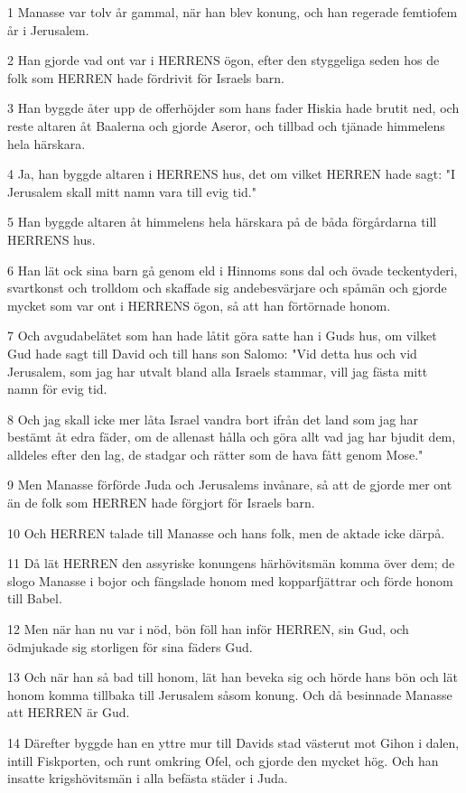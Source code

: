 \par 1 Manasse var tolv år gammal, när han blev konung, och han regerade femtiofem år i Jerusalem.
\par 2 Han gjorde vad ont var i HERRENS ögon, efter den styggeliga seden hos de folk som HERREN hade fördrivit för Israels barn.
\par 3 Han byggde åter upp de offerhöjder som hans fader Hiskia hade brutit ned, och reste altaren åt Baalerna och gjorde Aseror, och tillbad och tjänade himmelens hela härskara.
\par 4 Ja, han byggde altaren i HERRENS hus, det om vilket HERREN hade sagt: "I Jerusalem skall mitt namn vara till evig tid."
\par 5 Han byggde altaren åt himmelens hela härskara på de båda förgårdarna till HERRENS hus.
\par 6 Han lät ock sina barn gå genom eld i Hinnoms sons dal och övade teckentyderi, svartkonst och trolldom och skaffade sig andebesvärjare och spåmän och gjorde mycket som var ont i HERRENS ögon, så att han förtörnade honom.
\par 7 Och avgudabelätet som han hade låtit göra satte han i Guds hus, om vilket Gud hade sagt till David och till hans son Salomo: "Vid detta hus och vid Jerusalem, som jag har utvalt bland alla Israels stammar, vill jag fästa mitt namn för evig tid.
\par 8 Och jag skall icke mer låta Israel vandra bort ifrån det land som jag har bestämt åt edra fäder, om de allenast hålla och göra allt vad jag har bjudit dem, alldeles efter den lag, de stadgar och rätter som de hava fått genom Mose."
\par 9 Men Manasse förförde Juda och Jerusalems invånare, så att de gjorde mer ont än de folk som HERREN hade förgjort för Israels barn.
\par 10 Och HERREN talade till Manasse och hans folk, men de aktade icke därpå.
\par 11 Då lät HERREN den assyriske konungens härhövitsmän komma över dem; de slogo Manasse i bojor och fängslade honom med kopparfjättrar och förde honom till Babel.
\par 12 Men när han nu var i nöd, bön föll han inför HERREN, sin Gud, och ödmjukade sig storligen för sina fäders Gud.
\par 13 Och när han så bad till honom, lät han beveka sig och hörde hans bön och lät honom komma tillbaka till Jerusalem såsom konung. Och då besinnade Manasse att HERREN är Gud.
\par 14 Därefter byggde han en yttre mur till Davids stad västerut mot Gihon i dalen, intill Fiskporten, och runt omkring Ofel, och gjorde den mycket hög. Och han insatte krigshövitsmän i alla befästa städer i Juda.

